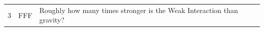 \documentclass[10pt]{article}
\begin{document}
\begin{tiny}
\begin{longtable}{r p{0.3in} p{1.212in} p{3.8in}}
    3  &          FFF &                                                                                                                                                                                                            Roughly how many times stronger is the Weak Interaction than gravity? &                                                                                                                                                                                                                                                                                                                                                                                                                                                                                                                                                                                                                                                                                                                                                                                                                                                                                                                                                                                                                                                                                                                                                                                                                                                                                                                                                                                                                                                                                                                                                                                                                                                                                                                                                                                                                                                                                                                                                                                                                                                                                                                                                                                                                                                                                                                                                                                                                                                                                                                                                                                                                                                                                                                                                                                                                                                                                                                                                                                                                                                                                               
\end{longtable}
\end{tiny}
\end{document}
